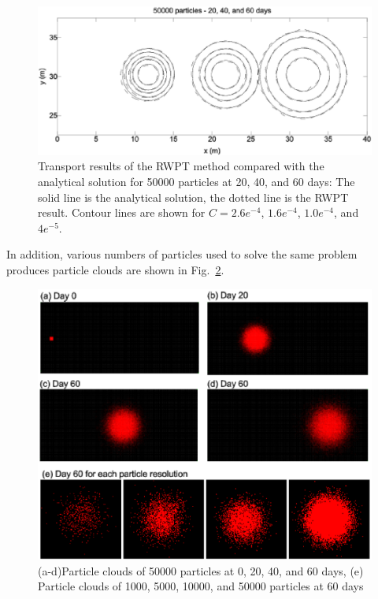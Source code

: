 \begin{figure}[htbp!]
\centering
\includegraphics[scale=0.60]{PART_II/C/TransportHomo50K.eps}
\caption{Transport results of the RWPT method compared with the
analytical solution for 50000 particles at 20, 40,
and 60 days: The solid line is the analytical solution, the dotted
line is the RWPT result. Contour lines are shown for $C=2.6e^{-4}$, $1.6e^{-4}$, $1.0e^{-4}$, and $4e^{-5}$.} 
\label{TransportHomo50K}
\end{figure}

In addition, various numbers of particles used to solve the same problem produces particle clouds are shown in Fig.~\ref{ParticleClouds}.

\begin{figure}[htbp!]
\centering
\includegraphics[scale=0.60]{PART_II/C/ParticleClouds.eps}
\caption{(a-d)Particle clouds of 50000 particles at 0, 20, 40, and 60 days, (e) Particle clouds of 1000, 5000, 10000, and 50000 particles at 60 days}
\label{ParticleClouds}
\end{figure}

